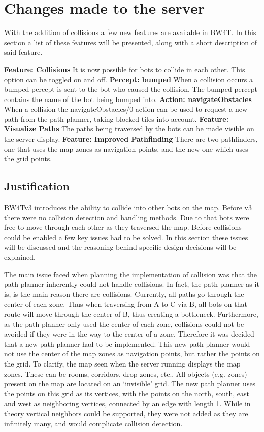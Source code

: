 \section{Changes made to the server}
With the addition of collisions a few new features are available in BW4T. In this section a list of these features will be presented, along with a short description of said feature.

\textbf{Feature: Collisions} It is now possible for bots to collide in each other. This option can be toggled on and off.
\textbf{Percept: bumped} When a collision occurs a bumped percept is sent to the bot who caused the collision. The bumped percept contains the name of the bot being bumped into.
\textbf{Action: navigateObstacles} When a collision the navigateObstacles/0 action can be used to request a new path from the path planner, taking blocked tiles into account.
\textbf{Feature: Visualize Paths} The paths being traversed by the bots can be made visible on the server display. 
\textbf{Feature: Improved Pathfinding} There are two pathfinders, one that uses the map zones as navigation points, and the new one which uses the grid points. 
		
\subsection{Justification}
BW4Tv3 introduces the ability to collide into other bots on the map. Before v3 there were no collision detection and handling methods. Due to that bots were free to move through each other as they traversed the map. Before collisions could be enabled a few key issues had to be solved. In this section these issues will be discussed and the reasoning behind specific design decisions will be explained. 

The main issue faced when planning the implementation of collision was that the path planner inherently could not handle collisions. In fact, the path planner as it is, is the main reason there are collisions. Currently, all paths go through the center of each zone. Thus when traversing from A to C via B, all bots on that route will move through the center of B, thus creating a bottleneck. Furthermore, as the path planner only used the center of each zone, collisions could not be avoided if they were in the way to the center of a zone.
Therefore it was decided that a new path planner had to be implemented. This new path planner would not use the center of the map zones as navigation points, but rather the points on the grid. To clarify, the map seen when the server running displays the map zones. These can be rooms, corridors, drop zones, etc.. All objects (e.g. zones) present on the map are located on an `invisible' grid. The new path planner uses the points on this grid as its vertices, with the points on the north, south, east and west as neighboring vertices, connected by an edge with length 1. 
While in theory vertical neighbors could be supported, they were not added as they are infinitely many, and would complicate collision detection. 

